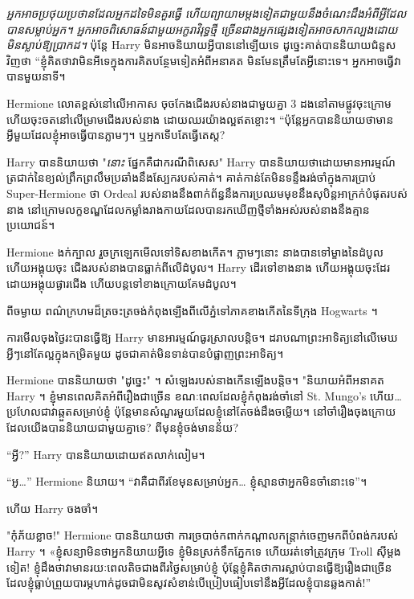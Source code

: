 {{{\emph{អ្នកអាចប្រថុយប្រថានដែលអ្នកដទៃមិនគួរធ្វើ ហើយព្យាយាមម្តងទៀតជាមួយនឹងចំណេះដឹងអំពីអ្វីដែលបានសម្លាប់អ្នក។ អ្នកអាចពិសោធន៍ជាមួយអក្ខរាវិរុទ្ធថ្មី ច្រើនជាងអ្នកផ្សេងទៀតអាចសាកល្បងដោយមិនស្លាប់ឱ្យប្រាកដ។} ប៉ុន្តែ Harry មិនអាចនិយាយអ្វីបាននៅឡើយទេ ដូច្នេះគាត់បាននិយាយជំនួសវិញថា “ខ្ញុំគិតថាវាមិនអីទេក្នុងការគិតបន្ថែមទៀតអំពីអនាគត មិនមែនត្រឹមតែអ្វីនោះទេ។ អ្នកអាចធ្វើវាបានមួយនាទី។

Hermione លោតខ្ពស់នៅលើអាកាស ចុចកែងជើងរបស់នាងជាមួយគ្នា 3 ដងនៅតាមផ្លូវចុះក្រោម ហើយចុះចតនៅលើម្រាមជើងរបស់នាង ដោយឈរយ៉ាងល្អឥតខ្ចោះ។ “ប៉ុន្តែអ្នកបាននិយាយថាមានអ្វីមួយដែលខ្ញុំអាចធ្វើបានភ្លាមៗ។ ឬអ្នកទើបតែធ្វើតេស្ត?

Harry បាននិយាយថា "\emph{នោះ} ផ្នែកគឺជាករណីពិសេស" Harry បាននិយាយថាដោយមានអារម្មណ៍ត្រជាក់នៃខ្យល់ព្រឹកព្រលឹមប្រឆាំងនឹងស្បែករបស់គាត់។ គាត់កាន់តែមិនទន្ទឹងរង់ចាំក្នុងការប្រាប់ Super-Hermione ថា Ordeal របស់នាងនឹងពាក់ព័ន្ធនឹងការប្រឈមមុខនឹងសុបិន្តអាក្រក់បំផុតរបស់នាង នៅក្រោមលក្ខខណ្ឌដែលកម្លាំងរាងកាយដែលបានរកឃើញថ្មីទាំងអស់របស់នាងនឹងគ្មានប្រយោជន៍។

Hermione ងក់ក្បាល រួចក្រឡេកមើលទៅទិសខាងកើត។ ភ្លាមៗនោះ នាងបានទៅម្ខាងនៃដំបូល ហើយអង្គុយចុះ ជើងរបស់នាងបានធ្លាក់ពីលើដំបូល។ Harry ដើរទៅខាងនាង ហើយអង្គុយចុះដែរ ដោយអង្គុយផ្ងារជើង ហើយបន្តទៅខាងក្រោយគែមដំបូល។

ពីចម្ងាយ ពណ៌ក្រហមដ៏ត្រចះត្រចង់កំពុងឡើងពីលើភ្នំទៅភាគខាងកើតនៃទីក្រុង Hogwarts ។

ការ​មើល​ចុង​ថ្ងៃ​រះ​បាន​ធ្វើ​ឱ្យ Harry មាន​អារម្មណ៍​ធូរស្រាល​បន្តិច។ ដរាបណាព្រះអាទិត្យនៅលើមេឃ អ្វីៗនៅតែល្អក្នុងកម្រិតមួយ ដូចជាគាត់មិនទាន់បានបំផ្លាញព្រះអាទិត្យ។

Hermione បាននិយាយថា "ដូច្នេះ" ។ សំឡេងរបស់នាងកើនឡើងបន្តិច។ "និយាយអំពីអនាគត Harry ។ ខ្ញុំមានពេលគិតអំពីរឿងជាច្រើន ខណៈពេលដែលខ្ញុំកំពុងរង់ចាំនៅ St. Mungo's ហើយ… ប្រហែលជាវាឆ្កួតសម្រាប់ខ្ញុំ ប៉ុន្តែមានសំណួរមួយដែលខ្ញុំនៅតែចង់ដឹងចម្លើយ។ នៅចាំរឿងចុងក្រោយដែលយើងបាននិយាយជាមួយគ្នាទេ? ពីមុនខ្ញុំចង់មានន័យ?

“អ្វី?” Harry បាននិយាយដោយឥតលាក់លៀម។

“អូ…” Hermione និយាយ។ “វា​គឺ​ជា​ពីរ​ខែ​មុន​សម្រាប់​អ្នក… ខ្ញុំ​ស្មាន​ថា​អ្នក​មិន​ចាំ​នោះ​ទេ”។

ហើយ Harry ចងចាំ។

"កុំភ័យខ្លាច!" Hermione បាន​និយាយ​ថា ការ​ច្របាច់​ក​ពាក់​កណ្ដាល​កន្ត្រាក់​ចេញ​មក​ពី​បំពង់ក​របស់ Harry ។ «ខ្ញុំសន្យាមិនថាអ្នកនិយាយអ្វីទេ ខ្ញុំមិនស្រក់ទឹកភ្នែកទេ ហើយរត់ទៅត្រូវក្រុម Troll ស៊ីម្តងទៀត! ខ្ញុំដឹងថាវាមានរយៈពេលតិចជាងពីរថ្ងៃសម្រាប់ខ្ញុំ ប៉ុន្តែខ្ញុំគិតថាការស្លាប់បានធ្វើឱ្យរឿងជាច្រើនដែលខ្ញុំធ្លាប់ព្រួយបារម្ភហាក់ដូចជាមិនសូវសំខាន់បើប្រៀបធៀបទៅនឹងអ្វីដែលខ្ញុំបានឆ្លងកាត់!”

}}}
